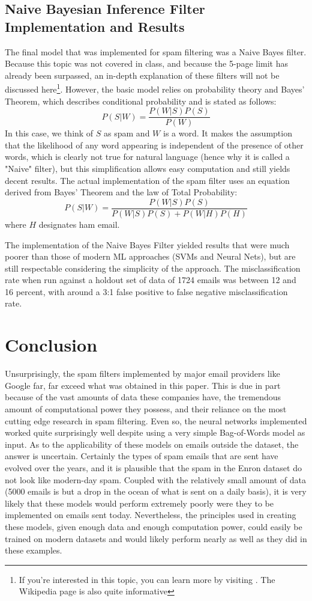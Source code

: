 \documentclass{article}
\begin{document}
\subsection{Naive Bayesian Inference Filter Implementation and Results}
The final model that was implemented for spam filtering was a Naive Bayes filter. Because this topic was not covered in class, and because the 5-page limit has already been surpassed, an in-depth explanation of these filters will not be discussed here\footnote{If you're interested in this topic, you can learn more by visiting \cite{Heckerman1998}. The Wikipedia page is also quite informative}. However, the basic model relies on probability theory and  Bayes' Theorem, which describes conditional probability and is stated as follows\cite{Heckerman1998}:
$$P(S|W) = \frac{P(W|S)P(S)}{P(W)}$$
 In this case, we think of $S$ as spam and $W$ is a word. It makes the assumption that the likelihood of any word appearing is independent of the presence of other words, which is clearly not true for natural language (hence why it is called a "Naive" filter), but this simplification allows easy computation and still yields decent results. The actual implementation of the spam filter uses an equation derived from Bayes' Theorem and the law of Total Probability\cite{Heckerman1998}:
$$P(S|W) = \frac{P(W|S)P(S)}{P(W|S)P(S) + P(W|H)P(H)}$$
where $H$ designates ham email.

The implementation of the Naive Bayes Filter yielded results that were much poorer than those of modern ML approaches (SVMs and Neural Nets), but are still respectable considering the simplicity of the approach. The misclassification rate when run against a holdout set of data of 1724 emails was between 12 and 16 percent, with around a 3:1 false positive to false negative misclassification rate.

\section*{Conclusion}
Unsurprisingly, the spam filters implemented by major email providers like Google far, far exceed what was obtained in this paper. This is due in part because of the vast amounts of data these companies have, the tremendous amount of computational power they possess, and their reliance on the most cutting edge research in spam filtering. Even so, the neural networks implemented worked quite surprisingly well despite using a very simple Bag-of-Words model as input. As to the applicability of these models on emails outside the dataset, the answer is uncertain. Certainly the types of spam emails that are sent have evolved over the years, and it is plausible that the spam in the Enron dataset do not look like modern-day spam. Coupled with the relatively small amount of data (5000 emails is but a drop in the ocean of what is sent on a daily basis), it is very likely that these models would perform extremely poorly were they to be implemented on emails sent today. Nevertheless, the principles used in creating these models, given enough data and enough computation power, could easily be trained on modern datasets and would likely perform nearly as well as they did in these examples.



\newpage
\printbibliography
\end{document}
